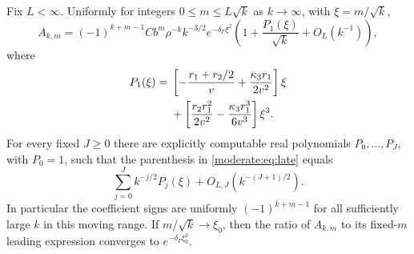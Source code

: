 \begin{theorem}\label{moderate:thm:late}
Fix $L<\infty$. Uniformly for integers $0\le m\le L\sqrt{k}$ as
$k\to\infty$, with $\xi=m/\sqrt{k}$,
\begin{equation}\label{moderate:eq:late}
 A_{k,m}=(-1)^{k+m-1}C b^m\rho^{-k}k^{-3/2}
 e^{-\delta_\Gamma\xi^2}
 \left(1+\frac{P_1(\xi)}{\sqrt{k}}+O_L(k^{-1})\right),
\end{equation}
where
\begin{align}\label{moderate:eq:P1}
 P_1(\xi)={}&\left[-\frac{r_1+r_2/2}{v}
             +\frac{\kappa_3r_1}{2v^2}\right]\xi\notag\\
 &+\left[\frac{r_2r_1^2}{2v^2}
             -\frac{\kappa_3r_1^3}{6v^3}\right]\xi^3.
\end{align}
For every fixed $J\ge0$ there are explicitly computable real
polynomials $P_0,\ldots,P_J$, with $P_0=1$, such that the parenthesis
in \eqref{moderate:eq:late} equals
\[
 \sum_{j=0}^J k^{-j/2}P_j(\xi)
       +O_{L,J}(k^{-(J+1)/2}).
\]
In particular the coefficient signs are uniformly $(-1)^{k+m-1}$ for all
sufficiently large $k$ in this moving range. If $m/\sqrt{k}\to\xi_0$,
then the ratio of $A_{k,m}$ to its fixed-$m$ leading expression converges
to $e^{-\delta_\Gamma\xi_0^2}$.
\end{theorem}

